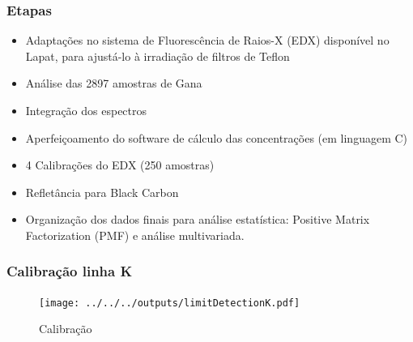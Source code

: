 \begin{frame}
  \frametitle{Etapas}
  \begin{itemize}
    \item Adaptações no sistema de Fluorescência de Raios-X (EDX) disponível no Lapat, 
          para ajustá-lo à irradiação de filtros de Teflon
    \item Análise das 2897 amostras de Gana
    \item Integração dos espectros
    \item Aperfeiçoamento do software de cálculo das concentrações (em linguagem C)  
    \item 4 Calibrações do EDX (250 amostras)
    \item Refletância para Black Carbon
    \item Organização dos dados finais para análise estatística: Positive Matrix Factorization (PMF)
	  e análise multivariada.
 \end{itemize}
\end{frame}

\begin{frame}
  \frametitle{Calibração linha K}
  \begin{figure}[H]
    \centering
    \caption{Calibração}
    \texttt{[image: ../../../outputs/limitDetectionK.pdf]}
  \end{figure}
\end{frame}

